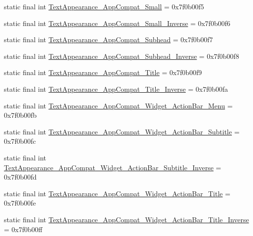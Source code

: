 \begin{CompactItemize}
\item 
static final int \hyperlink{classandroid_1_1support_1_1graphics_1_1drawable_1_1animated_1_1_r_1_1style_f39bd6dca184449dfe0b54bb75a7648b}{TextAppearance\_\-AppCompat\_\-Small} = 0x7f0b00f5
\item 
static final int \hyperlink{classandroid_1_1support_1_1graphics_1_1drawable_1_1animated_1_1_r_1_1style_222eea32e772a58d5b1fd3cb481876f4}{TextAppearance\_\-AppCompat\_\-Small\_\-Inverse} = 0x7f0b00f6
\item 
static final int \hyperlink{classandroid_1_1support_1_1graphics_1_1drawable_1_1animated_1_1_r_1_1style_15a4ca9ad4928da4278ec75b097877e8}{TextAppearance\_\-AppCompat\_\-Subhead} = 0x7f0b00f7
\item 
static final int \hyperlink{classandroid_1_1support_1_1graphics_1_1drawable_1_1animated_1_1_r_1_1style_c1ab32a90fdbdc9e88d5d85e504c5809}{TextAppearance\_\-AppCompat\_\-Subhead\_\-Inverse} = 0x7f0b00f8
\item 
static final int \hyperlink{classandroid_1_1support_1_1graphics_1_1drawable_1_1animated_1_1_r_1_1style_94cb9532afa8d846b35f41ff33a6cbc0}{TextAppearance\_\-AppCompat\_\-Title} = 0x7f0b00f9
\item 
static final int \hyperlink{classandroid_1_1support_1_1graphics_1_1drawable_1_1animated_1_1_r_1_1style_49695cd4f0b7409c2572c093fd61abf6}{TextAppearance\_\-AppCompat\_\-Title\_\-Inverse} = 0x7f0b00fa
\item 
static final int \hyperlink{classandroid_1_1support_1_1graphics_1_1drawable_1_1animated_1_1_r_1_1style_9a533eb2c69b46d08623503c3c2e0fa4}{TextAppearance\_\-AppCompat\_\-Widget\_\-ActionBar\_\-Menu} = 0x7f0b00fb
\item 
static final int \hyperlink{classandroid_1_1support_1_1graphics_1_1drawable_1_1animated_1_1_r_1_1style_ab14bff10efa697d118a0fb441704c4b}{TextAppearance\_\-AppCompat\_\-Widget\_\-ActionBar\_\-Subtitle} = 0x7f0b00fc
\item 
static final int \hyperlink{classandroid_1_1support_1_1graphics_1_1drawable_1_1animated_1_1_r_1_1style_323f4ec75adfb8c79a95f09b2a0f6785}{TextAppearance\_\-AppCompat\_\-Widget\_\-ActionBar\_\-Subtitle\_\-Inverse} = 0x7f0b00fd
\item 
static final int \hyperlink{classandroid_1_1support_1_1graphics_1_1drawable_1_1animated_1_1_r_1_1style_2c883c5a322fd2e56d44b868dcd421c8}{TextAppearance\_\-AppCompat\_\-Widget\_\-ActionBar\_\-Title} = 0x7f0b00fe
\item 
static final int \hyperlink{classandroid_1_1support_1_1graphics_1_1drawable_1_1animated_1_1_r_1_1style_8bff31883576f9600d0b6886be6c0fe3}{TextAppearance\_\-AppCompat\_\-Widget\_\-ActionBar\_\-Title\_\-Inverse} = 0x7f0b00ff

\end{CompactItemize}
